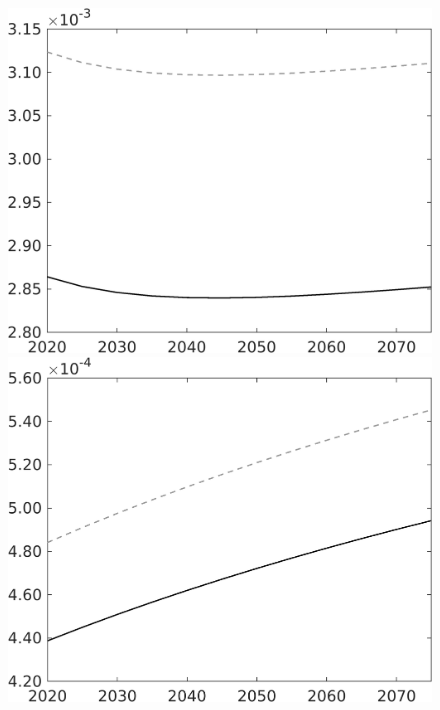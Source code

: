 \documentclass[12pt]{article}
\begin{document}
\begin{figure}[h!!]
\begin{minipage}[]{0.32\textwidth}
	\end{minipage}	
	\begin{minipage}[]{0.32\textwidth}
		\includegraphics[width=1\textwidth]{../../codding_model/own_basedOnFried/optimalPol_010922_revision/figures/all_13Sept22/CompTaul_LFBAU_Reg0_Lf_spillover0_nsk0_xgr0_knspil0_sep1_countec0_GovRev0_etaa0.79_lgd0.png}
	\end{minipage}	
	\begin{minipage}[]{0.32\textwidth}
		\includegraphics[width=1\textwidth]{../../codding_model/own_basedOnFried/optimalPol_010922_revision/figures/all_13Sept22/CompTaul_LFBAU_Reg0_Lg_spillover0_nsk0_xgr0_knspil0_sep1_countec0_GovRev0_etaa0.79_lgd0.png}

\end{minipage}
\end{figure}
\end{document}
